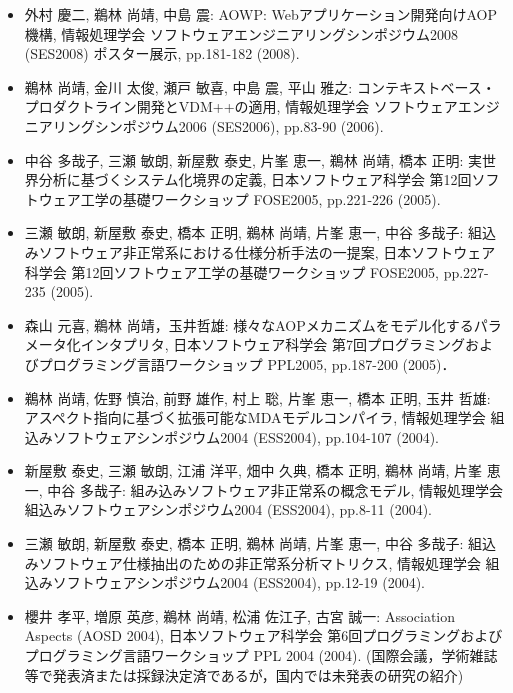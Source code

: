 \documentclass{jarticle}
\begin{document}
\begin{itemize}
\item 外村 慶二, 鵜林 尚靖, 中島 震:
AOWP: Webアプリケーション開発向けAOP機構,
情報処理学会 ソフトウェアエンジニアリングシンポジウム2008 (SES2008) ポスター展示, pp.181-182 (2008).

\item 鵜林 尚靖, 金川 太俊, 瀬戸 敏喜, 中島 震, 平山 雅之:
コンテキストベース・プロダクトライン開発とVDM++の適用,
情報処理学会 ソフトウェアエンジニアリングシンポジウム2006 (SES2006),
pp.83-90 (2006).

\item 中谷 多哉子, 三瀬 敏朗, 新屋敷 泰史, 片峯 恵一, 鵜林 尚靖, 橋本 正明:
実世界分析に基づくシステム化境界の定義,
日本ソフトウェア科学会 第12回ソフトウェア工学の基礎ワークショップ FOSE2005,
pp.221-226 (2005).

\item 三瀬 敏朗, 新屋敷 泰史, 橋本 正明, 鵜林 尚靖, 片峯 恵一, 中谷 多哉子:
組込みソフトウェア非正常系における仕様分析手法の一提案,
日本ソフトウェア科学会 第12回ソフトウェア工学の基礎ワークショップ FOSE2005,
pp.227-235 (2005).

\item 森山 元喜, 鵜林 尚靖，玉井哲雄:
様々なAOPメカニズムをモデル化するパラメータ化インタプリタ,
日本ソフトウェア科学会 第7回プログラミングおよびプログラミング言語ワークショップ PPL2005,
pp.187-200 (2005)．

\item 鵜林 尚靖, 佐野 慎治, 前野 雄作, 村上 聡, 片峯 恵一, 橋本 正明, 玉井 哲雄:
アスペクト指向に基づく拡張可能なMDAモデルコンパイラ,
情報処理学会 組込みソフトウェアシンポジウム2004 (ESS2004), pp.104-107 (2004).

\item 新屋敷 泰史, 三瀬 敏朗, 江浦 洋平, 畑中 久典, 橋本 正明, 鵜林 尚靖, 片峯 恵一, 中谷 多哉子:
組み込みソフトウェア非正常系の概念モデル,
情報処理学会 組込みソフトウェアシンポジウム2004 (ESS2004), pp.8-11 (2004).

\item 三瀬 敏朗, 新屋敷 泰史, 橋本 正明, 鵜林 尚靖, 片峯 恵一, 中谷 多哉子:
組込みソフトウェア仕様抽出のための非正常系分析マトリクス,
情報処理学会 組込みソフトウェアシンポジウム2004 (ESS2004), pp.12-19 (2004).

\item 櫻井 孝平, 増原 英彦, 鵜林 尚靖, 松浦 佐江子, 古宮 誠一:
Association Aspects (AOSD 2004),
日本ソフトウェア科学会 第6回プログラミングおよびプログラミング言語ワークショップ PPL 2004 (2004).
(国際会議，学術雑誌等で発表済または採録決定済であるが，国内では未発表の研究の紹介)


\end{itemize}
\end{document}
